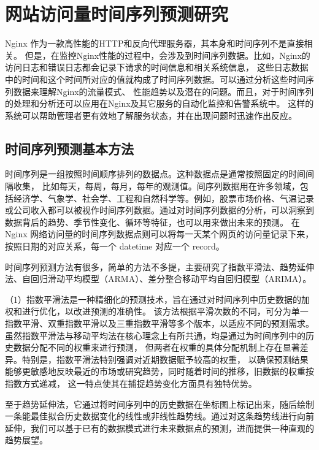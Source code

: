 \chapter{网站访问量时间序列预测研究}

Nginx 作为一款高性能的HTTP和反向代理服务器，其本身和时间序列不是直接相关。
但是，在监控Nginx性能的过程中，会涉及到时间序列数据。比如，Nginx的访问日志和错误日志都会记录下请求的时间信息和相关系统信息，
这些日志数据中的时间和这个时间所对应的值就构成了时间序列数据。可以通过分析这些时间序列数据来理解Nginx的流量模式、
性能趋势以及潜在的问题。而且，对于时间序列的处理和分析还可以应用在Nginx及其它服务的自动化监控和告警系统中。
这样的系统可以帮助管理者更有效地了解服务状态，并在出现问题时迅速作出反应。

\section{时间序列预测基本方法}

时间序列是一组按照时间顺序排列的数据点。这种数据点是通常按照固定的时间间隔收集，
比如每天，每周，每月，每年的观测值。间序列数据用在许多领域，包括经济学、气象学、社会学、工程和自然科学等。例如，股票市场价格、气温记录或公司收入都可以被视作时间序列数据。通过对时间序列数据的分析，可以洞察到数据背后的趋势、季节性变化、循环等特征，也可以用来做出未来的预测。
在 Nginx 网络访问量的时间序列数据点则可以将每一天某个网页的访问量记录下来，按照日期的对应关系，每一个 datetime 对应一个 record。

时间序列预测方法有很多，简单的方法不多提，主要研究了指数平滑法、趋势延伸法、自回归滑动平均模型（ARMA）、差分整合移动平均自回归模型（ARIMA）。

（1）指数平滑法是一种精细化的预测技术，旨在通过对时间序列中历史数据的加权和进行优化，以改进预测的准确性。
该方法根据平滑次数的不同，可分为单一指数平滑、双重指数平滑以及三重指数平滑等多个版本，以适应不同的预测需求。
虽然指数平滑法与移动平均法在核心理念上有所共通，均是通过为时间序列中的历史数据分配不同的权重来进行预测，
但两者在权重的具体分配机制上存在显著差异。特别是，指数平滑法特别强调对近期数据赋予较高的权重，
以确保预测结果能够更敏感地反映最近的市场或研究趋势，同时随着时间的推移，旧数据的权重按指数方式递减，
这一特点使其在捕捉趋势变化方面具有独特优势。

至于趋势延伸法，它通过将时间序列中的历史数据在坐标图上标记出来，随后绘制一条能最佳拟合历史数据变化的线性或非线性趋势线。通过对这条趋势线进行向前延伸，我们可以基于已有的数据模式进行未来数据点的预测，进而提供一种直观的趋势展望。

